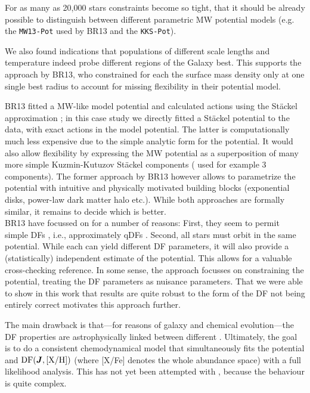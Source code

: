 For as many as 20,000 stars constraints become so tight, that it should be already possible to distinguish between different parametric MW potential models (e.g. the \texttt{MW13-Pot} used by BR13 and the \texttt{KKS-Pot}).  

We also found indications that populations of different scale lengths and temperature indeed probe different regions of the Galaxy best.  This supports the approach by BR13, who constrained for each \MAP{} the surface mass density only at one single best radius to account for missing flexibility in their potential model.

BR13 fitted a MW-like model potential and calculated actions using the St\"{a}ckel approximation \citep{2012MNRAS.426.1324B}; in this case study we directly fitted a St\"{a}ckel potential to the data, with exact actions in the model potential. The latter is computationally much less expensive due to the simple analytic form for the potential. It would also allow flexibility by expressing the MW potential as a superposition of many more simple Kuzmin-Kutuzov St\"{a}ckel components (\citet{2003MNRAS.340..752F} used for example 3 components). The former approach by BR13 however allows to parametrize the potential with intuitive and physically motivated building blocks (exponential disks, power-law dark matter halo etc.). While both approaches are formally similar, it remains to decide which is better.\\

 BR13 have focussed on \MAPs{} for a number of reasons: First, they seem to permit simple DFs \citep{bov12b,bov12c,2012ApJ...753..148B}, i.e., approximately qDFs \citep{2013MNRAS.434..652T}. Second, all stars must orbit in the same potential. While each \MAP{} can yield different DF parameters, it will also provide a (statistically) independent estimate of the potential. This allows for a valuable cross-checking reference. In some sense, the\RM{} approach focusses on constraining the potential, treating the DF parameters as nuisance parameters. That we were able to show in this work that \RM{} results are quite robust to the form of the DF not being entirely correct motivates this approach further. 

The main drawback is that---for reasons of galaxy and chemical evolution---the DF properties are astrophysically linked between different \MAPs{}. Ultimately, the goal is to do a consistent chemodynamical model that simultaneously fits the potential and $\text{DF}(\boldsymbol{J},\text{[X/H]})$ (where [X/Fe] denotes the whole abundance space) with a full likelihood analysis. This has not yet been attempted with \RM{}, because the behaviour is quite complex. 

